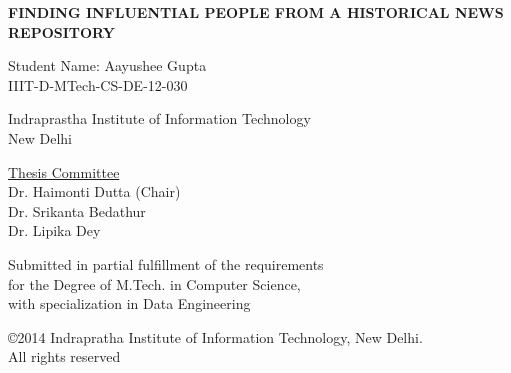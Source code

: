 

\def\addrone{Your address}
\def\addrtwo{Your city}

\def\degree{M.Tech. in Computer Science with Specialization in Data Engineering}


\def\submissiondate{June 01, 2014}

\def\supervisorone{Dr. Haimonti Dutta (Chair)}

\def\supervisortwo{Dr. Srikanta Bedathur}

\def\supervisorthree{Dr. Lipika Dey}





\thispagestyle{empty}

\begin{center}

{\LARGE \bf {FINDING INFLUENTIAL PEOPLE FROM A HISTORICAL NEWS REPOSITORY }

 }  
 \vspace{.3in}
 
 {\Large{Student Name: Aayushee Gupta}} \\  
 \vspace{.1in} 
 IIIT-D-MTech-CS-DE-12-030 \\

  
    \vspace{.35in}

  \vspace{.25in}

{Indraprastha Institute of Information Technology\\
New Delhi}

\vspace{.35in}  {\underline{Thesis Committee} \\ \supervisorone         
   \\ \supervisortwo \\ \supervisorthree }\\ \vspace{.35in}


 {Submitted in partial fulfillment of the requirements \\for the Degree of M.Tech. in Computer Science, \\ with specialization in Data Engineering}

\vspace{.2in}

\copyright 2014 Indrapratha Institute of Information Technology, New Delhi. \\ All rights reserved \\
\vspace{.8in}


\end{center}

